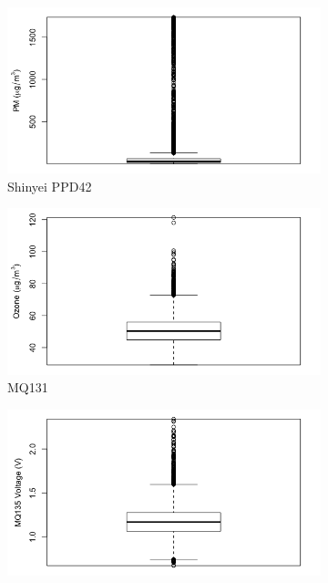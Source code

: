 \documentclass[11pt]{report}
\begin{document}
\begin{figure}[!htbp]
    \centering
    \begin{minipage}{1\linewidth}
            \begin{subfigure}[t]{.5\linewidth}
                \includegraphics[width=\textwidth]{images/pm_boxplot}
                \caption{Shinyei PPD42}
                \label{fig:pm_boxplot}
            \end{subfigure}
            \begin{subfigure}[t]{.5\linewidth}
            	\includegraphics[width=\textwidth]{images/ozone_boxplot}
            	\caption{MQ131}
            	\label{fig:mq131_boxplot}
	   \end{subfigure}
        \end{minipage}
    \begin{minipage}{1\linewidth}
            \begin{subfigure}[t]{.5\linewidth}
                \includegraphics[width=\textwidth]{images/mq135_boxplot}

\end{subfigure}
\end{minipage}
\end{figure}
\end{document}
